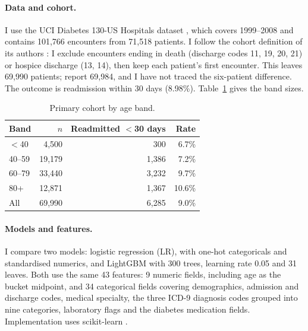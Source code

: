\documentclass{article}
\begin{document}
\paragraph{Data and cohort.} I use the UCI Diabetes 130-US Hospitals dataset \citep{uci2014}, which covers 1999--2008 and contains 101,766 encounters from 71,518 patients. I follow the cohort definition of its authors \citep{strack2014}: I exclude encounters ending in death (discharge codes 11, 19, 20, 21) or hospice discharge (13, 14), then keep each patient's first encounter. This leaves 69,990 patients; \citet{strack2014} report 69,984, and I have not traced the six-patient difference. The outcome is readmission within 30 days (8.98\%). Table~\ref{tab:cohort} gives the band sizes.

\begin{table}[h]
\centering\small
\caption{Primary cohort by age band.}
\label{tab:cohort}
\begin{tabular}{@{}lrrr@{}}
\toprule
Band & $n$ & Readmitted $<$30 days & Rate \\
\midrule
$<$40 & 4,500 & 300 & 6.7\% \\
40--59 & 19,179 & 1,386 & 7.2\% \\
60--79 & 33,440 & 3,232 & 9.7\% \\
80+ & 12,871 & 1,367 & 10.6\% \\
\midrule
All & 69,990 & 6,285 & 9.0\% \\
\bottomrule
\end{tabular}
\end{table}

\paragraph{Models and features.} I compare two models: logistic regression (LR), with one-hot categoricals and standardised numerics, and LightGBM \citep{ke2017} with 300 trees, learning rate 0.05 and 31 leaves. Both use the same 43 features: 9 numeric fields, including age as the bucket midpoint, and 34 categorical fields covering demographics, admission and discharge codes, medical specialty, the three ICD-9 diagnosis codes grouped into nine categories, laboratory flags and the diabetes medication fields. Implementation uses scikit-learn \citep{pedregosa2011}.
\end{document}
